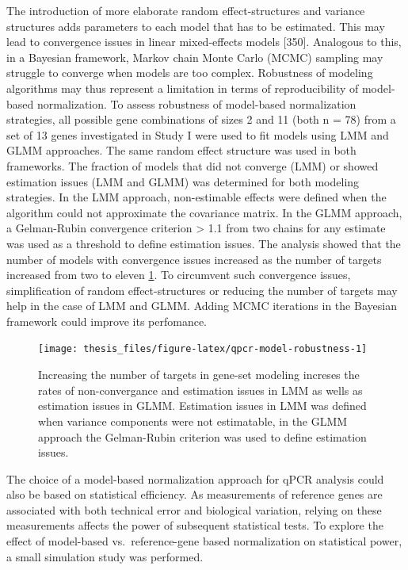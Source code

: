 \documentclass[twoside,10pt]{gihclass} %
\begin{document}
The introduction of more elaborate random effect-structures and variance structures adds parameters to each model that has to be estimated. This may lead to convergence issues in linear mixed-effects models
{[}350{]}.
Analogous to this, in a Bayesian framework, Markov chain Monte Carlo (MCMC) sampling may struggle to converge when models are too complex.
Robustness of modeling algorithms may thus represent a limitation in terms of reproducibility of model-based normalization.
To assess robustness of model-based normalization strategies, all possible gene combinations of sizes 2 and 11 (both n = 78) from a set of 13 genes investigated in Study I were used to fit models using LMM and GLMM approaches.
The same random effect structure was used in both frameworks.
The fraction of models that did not converge (LMM) or showed estimation issues (LMM and GLMM) was determined for both modeling strategies. In the LMM approach, non-estimable effects were defined when the algorithm could not approximate the covariance matrix. In the GLMM approach, a Gelman-Rubin convergence criterion \textgreater{} 1.1 from two chains for any estimate was used as a threshold to define estimation issues.
The analysis showed that the number of models with convergence issues increased as the number of targets increased from two to eleven \ref{fig:qpcr-model-robustness}. To circumvent such convergence issues, simplification of random effect-structures or reducing the number of targets may help in the case of LMM and GLMM. Adding MCMC iterations in the Bayesian framework could improve its perfomance.
\begin{figure}

{\centering \texttt{[image: thesis\_files/figure-latex/qpcr-model-robustness-1]} 

}

\caption[Robustness of model-based qPCR normalization]{Increasing the number of targets in gene-set modeling increses the rates of non-convergance and estimation issues in LMM as wells as estimation issues in GLMM. Estimation issues in LMM was defined when variance components were not estimatable, in the GLMM approach the Gelman-Rubin criterion was used to define estimation issues.}\label{fig:qpcr-model-robustness}
\end{figure}
The choice of a model-based normalization approach for qPCR analysis could also be based on statistical efficiency. As measurements of reference genes are associated with both technical error and biological variation, relying on these measurements affects the power of subsequent statistical tests. To explore the effect of model-based vs.~reference-gene based normalization on statistical power, a small simulation study was performed.
\end{document}
